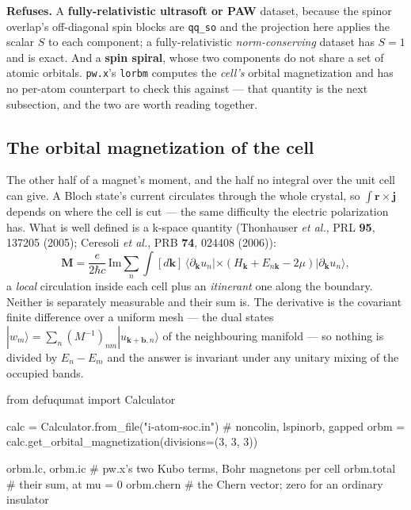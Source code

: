\documentclass[11pt,a4paper]{article}
\newcommand{\code}[1]{\texttt{\small #1}}
\begin{document}
\begin{refuses}
\textbf{Refuses.} A \textbf{fully-relativistic ultrasoft or
PAW} dataset, because the spinor overlap's off-diagonal spin blocks are
\code{qq\_so} and the projection here applies the scalar $S$ to each component;
a fully-relativistic \emph{norm-conserving} dataset has $S = 1$ and is exact. And
a \textbf{spin spiral}, whose two components do not share a set of atomic
orbitals. \code{pw.x}'s \code{lorbm} computes the \emph{cell's} orbital
magnetization and has no per-atom counterpart to check this against --- that
quantity is the next subsection, and the two are worth reading together.
\end{refuses}

\subsection{The orbital magnetization of the cell}

The other half of a magnet's moment, and the half no integral over the unit cell
can give. A Bloch state's current circulates through the whole crystal, so
$\int \mathbf r \times \mathbf j$ depends on where the cell is cut --- the same
difficulty the electric polarization has. What is well defined is a k-space
quantity (Thonhauser \emph{et al.}, PRL \textbf{95}, 137205 (2005); Ceresoli
\emph{et al.}, PRB \textbf{74}, 024408 (2006)):
\begin{equation*}
  \mathbf M = \frac{e}{2\hbar c}\,\mathrm{Im} \sum_n \int [d\mathbf k]\,
    \langle \partial_{\mathbf k} u_n | \times
      \left( H_{\mathbf k} + E_{n\mathbf k} - 2\mu \right)
    | \partial_{\mathbf k} u_n \rangle,
\end{equation*}
a \emph{local} circulation inside each cell plus an \emph{itinerant} one along
the boundary. Neither is separately measurable and their sum is. The derivative
is the covariant finite difference over a uniform mesh --- the dual states
$|w_m\rangle = \sum_n (M^{-1})_{nm} |u_{\mathbf k + \mathbf b, n}\rangle$ of the
neighbouring manifold --- so nothing is divided by $E_n - E_m$ and the answer is
invariant under any unitary mixing of the occupied bands.

\begin{pycode}
from defuqumat import Calculator

calc = Calculator.from_file("i-atom-soc.in")    # noncolin, lspinorb, gapped
orbm = calc.get_orbital_magnetization(divisions=(3, 3, 3))

orbm.lc, orbm.ic     # pw.x's two Kubo terms, Bohr magnetons per cell
orbm.total           # their sum, at mu = 0
orbm.chern           # the Chern vector; zero for an ordinary insulator
\end{pycode}
\end{document}
